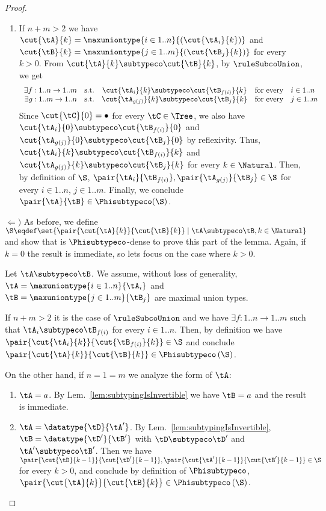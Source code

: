 \begin{proof}
\begin{enumerate}
  \item If $n + m > 2$ we have $\cut{\tA}{k} = \maxuniontype{i \in
  1..n}{(\cut{\tA_i}{k})}$ and $\cut{\tB}{k} = \maxuniontype{j \in
  1..m}{(\cut{\tB_j}{k})}$ for every $k > 0$. From $\cut{\tA}{k} \subtypeco
  \cut{\tB}{k}$, by $\ruleSubcoUnion$, we get $$
\begin{array}{r@{\quad\text{s.t.}\quad}c@{\quad\text{for every}\quad}l}
\exists f : 1..n \to 1..m & \cut{\tA_i}{k} \subtypeco \cut{\tB_{f(i)}}{k} & i \in 1..n \\
\exists g : 1..m \to 1..n & \cut{\tA_{g(j)}}{k} \subtypeco \cut{\tB_j}{k} & j \in 1..m
\end{array} $$
  Since $\cut{\tC}{0} = \bullet$ for every $\tC \in \Tree$, we also have
  $\cut{\tA_i}{0} \subtypeco \cut{\tB_{f(i)}}{0}$ and $\cut{\tA_{g(j)}}{0}
  \subtypeco \cut{\tB_j}{0}$ by reflexivity. Thus, $\cut{\tA_i}{k} \subtypeco
  \cut{\tB_{f(i)}}{k}$ and $\cut{\tA_{g(j)}}{k} \subtypeco \cut{\tB_j}{k}$ for
  every $k \in \Natural$. Then, by definition of $\S$,
  $\pair{\tA_i}{\tB_{f(i)}}, \pair{\tA_{g(j)}}{\tB_j} \in \S$ for every $i \in
  1..n$, $j \in 1..m$. Finally, we conclude $\pair{\tA}{\tB} \in
  \Phisubtypeco\!\left(\S\right)$.
\end{enumerate}


$\Leftarrow)$ As before, we define $\S \eqdef
\set{\pair{\cut{\tA}{k}}{\cut{\tB}{k}} \mathrel| \tA \subtypeco \tB, k \in
\Natural}$ and show that is $\Phisubtypeco$-dense to prove this part of the
lemma. Again, if $k = 0$ the result is immediate, so lets focus on the case
where $k > 0$.

Let $\tA \subtypeco \tB$. We assume, without loss of generality, $\tA =
\maxuniontype{i \in 1..n}{\tA_i}$ and $\tB = \maxuniontype{j \in 1..m}{\tB_j}$
are maximal union types.

If $n + m > 2$ it is the case of $\ruleSubcoUnion$ and we have $\exists f :
1..n \to 1..m$ such that $\tA_i \subtypeco \tB_{f(i)}$ for every $i \in 1..n$.
Then, by definition we have $\pair{\cut{\tA_i}{k}}{\cut{\tB_{f(i)}}{k}} \in \S$
and conclude $\pair{\cut{\tA}{k}}{\cut{\tB}{k}} \in
\Phisubtypeco\left(\S\right)$.

On the other hand, if $n = 1 = m$ we analyze the form of $\tA$:
\begin{enumerate}
  \item $\tA = a$. By Lem.~\ref{lem:subtypingIsInvertible} we have $\tB = a$
  and the result is immediate.
  
  \item $\tA = \datatype{\tD}{\tA'}$. By Lem.~\ref{lem:subtypingIsInvertible},
  $\tB = \datatype{\tD'}{\tB'}$ with $\tD \subtypeco \tD'$ and $\tA' \subtypeco
  \tB'$. Then we have $\pair{\cut{\tD}{k-1}}{\cut{\tD'}{k-1}},
  \pair{\cut{\tA'}{k-1}}{\cut{\tB'}{k-1}} \in \S$ for every $k > 0$, and
  conclude by definition of $\Phisubtypeco$, $\pair{\cut{\tA}{k}}{\cut{\tB}{k}}
  \in \Phisubtypeco\left(\S\right)$.
  

\end{enumerate}
\end{proof}
